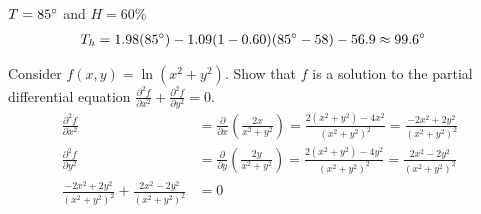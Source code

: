 \documentclass[12pt]{article}
\newenvironment{problem}[2][]{
    \begin{trivlist}
        \item[
            {\bfseries #1}
            {\bfseries #2.}
        ]
}{\end{trivlist}}
\begin{document}
\begin{problem}{45}
    $T = 85\degree$ and $H = 60\%$
    \begin{align}
        T_h &= 1.98(85\degree) - 1.09(1 - 0.60)(85\degree - 58) - 56.9 \approx 99.6\degree
    \end{align}
\end{problem}

\begin{problem}{67}
    Consider $f(x,y) = \ln \left(x^2 + y^2\right)$. Show that $f$ is a solution to the partial differential equation $\frac{\partial^2 f}{\partial x^2} + \frac{\partial^2 f}{\partial y^2} = 0$.
    \begin{align}
        \frac{\partial^2 f}{\partial x^2} &= \frac{\partial}{\partial x} \left(\frac{2x}{x^2 + y^2}\right) = \frac{2\left(x^2 + y^2\right) - 4x^2}{\left(x^2 + y^2\right)^2} = \frac{-2x^2 + 2y^2}{\left(x^2 + y^2\right)^2} \\
        \frac{\partial^2 f}{\partial y^2} &= \frac{\partial}{\partial y} \left(\frac{2y}{x^2 + y^2}\right) = \frac{2\left(x^2 + y^2\right) - 4y^2}{\left(x^2 + y^2\right)^2} = \frac{2x^2 - 2y^2}{\left(x^2 + y^2\right)^2} \\
        \frac{-2x^2 + 2y^2}{\left(x^2 + y^2\right)^2} + \frac{2x^2 - 2y^2}{\left(x^2 + y^2\right)^2} &= 0
    \end{align}
\end{problem}
\end{document}
